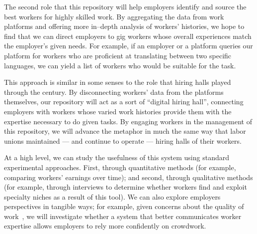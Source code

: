 \documentclass{article}
\newcommand{\topic}[1]{{\color{Blue}#1}}
\begin{document}
\topic{The second role that this repository will help employers identify and source the best workers for highly skilled work.}
By aggregating the data from work platforms and
offering more in--depth analysis of workers' histories, we hope to find that
we can direct employers to gig workers whose overall experiences match the employer's given needs.
For example, if an employer or a platform queries our platform for
workers who are proficient at translating between two specific languages,
we can yield a list of workers who would be suitable for the task.

\topic{This approach is similar in some senses to the role that hiring halls played through the \nth{20} century.}
By disconnecting workers' data from the platforms themselves, our repository will act as a sort of ``digital hiring hall'',
connecting employers with workers whose varied work histories provide them with the expertise necessary to do given tasks.
By engaging workers in the management of this repository, we will advance the metaphor in much the same way that
labor unions maintained --- and continue to operate --- hiring halls of their workers.



\topic{At a high level, we can study the usefulness of this system using standard experimental approaches.}
First, through quantitative methods (for example, comparing workers' earnings over time); and
second, through qualitative  methods (for example, through interviews to determine whether workers find and exploit specialty niches as a result of this tool).
We can also explore employers perspectives in tangible ways;
for example, given concerns about the quality of work~\cite{Ipeirotis:2010:QMA:1837885.1837906,le2010ensuring,Law:2017:CTR:2998181.2998197},
we will investigate whether a system that better communicates worker expertise allows employers to rely more confidently on crowdwork.

\begin{comment}
\topic{More broadly, we can think of this as an opportunity to engage in participatory design and democracy, and
to learn best practices through experimentation.}
We can take this opportunity to study collective governance in online settings
--- extending, as \citeauthor{russell1982collective} describes it,
from the ``one--shot'' cases of collective action that we instantiated in our earlier work~\cite{dynamo}
      to ``ongoing'' collective action~\cite{russell1982collective}.
While considerable effort has gone toward collective governance
(e.g.~\cite{ostrom1990governing,mccallum2013global,ahlquist2013interest,olsonlogic,polletta2002freedom}),
many of these mechanisms rely on collocation to some extent or another;
the best practices of collective governance for communities that never meet
(e.g moderators and administrators on Wikipedia)
remains unclear.
\end{comment}
\end{document}
